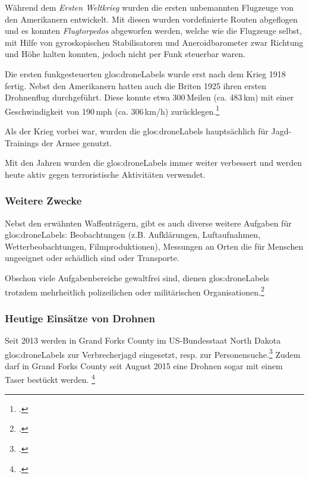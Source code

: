 Während dem \textit{Ersten Weltkrieg} wurden die ersten unbemannten Flugzeuge von den Amerikanern entwickelt.
Mit diesen wurden vordefinierte Routen abgeflogen und es konnten \textit{Flugtorpedos} abgeworfen werden, welche wie die Flugzeuge selbst, mit Hilfe von gyroskopischen Stabilisatoren und Aneroidbarometer zwar Richtung und Höhe halten konnten, jedoch nicht per Funk steuerbar waren.

Die ersten funkgesteuerten \glspl{glos:droneLabel} wurde erst nach dem Krieg 1918 fertig.
Nebst den Amerikanern hatten auch die Briten 1925 ihren ersten Drohnenflug durchgeführt. Diese konnte etwa 300\,Meilen (ca. 483\,km) mit einer Geschwindigkeit von 190\,mph (ca. 306\,km/h) zurücklegen.\footcite{Informatik_und_Gesellschaft_2015-03-21}

Als der Krieg vorbei war, wurden die \glspl{glos:droneLabel} hauptsächlich für Jagd-Trainings der Armee genutzt.

Mit den Jahren wurden die \glspl{glos:droneLabel} immer weiter verbessert und werden heute aktiv gegen terroristische Aktivitäten verwendet.

\subsubsection{Weitere Zwecke}
Nebst den erwähnten Waffenträgern, gibt es auch diverse weitere Aufgaben für \glspl{glos:droneLabel}: Beobachtungen (z.B. Aufklärungen, Luftaufnahmen, Wetterbeobachtungen, Filmproduktionen), Messungen an Orten die für Menschen ungeeignet oder schädlich sind oder Transporte.

Obschon viele Aufgabenbereiche gewaltfrei sind, dienen \glspl{glos:droneLabel} trotzdem mehrheitlich polizeilichen oder militärischen Organisationen.\footcite{Die_Geschichte_der_Drohnen_DiePresse.com_2015-03-21}

\subsubsection{Heutige Einsätze von Drohnen}
Seit 2013 werden in Grand Forks County im US-Bundesstaat North Dakota \glspl{glos:droneLabel} zur Verbrecherjagd eingesetzt, resp. zur Personensuche.\footcite{Grand_Forks_Drone_Assisted_Policing_2015-08-28}
Zudem darf in Grand Forks County seit August 2015 eine Drohnen sogar mit einem Taser bestückt werden. \footcite{First_State_Legalizes_Taser_Drones_for_Cops_Thanks_to_a_Lobbyist_The_Daily_Beast_2015-08-28}

